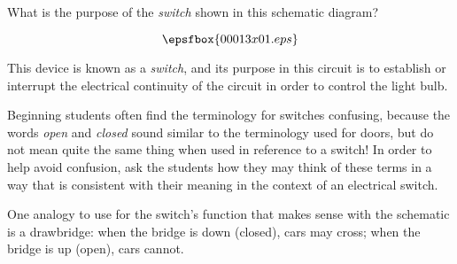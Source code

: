 

What is the purpose of the {\it switch} shown in this schematic diagram?

$$\epsfbox{00013x01.eps}$$







This device is known as a {\it switch}, and its purpose in this circuit is to establish or interrupt the electrical continuity of the circuit in order to control the light bulb.







Beginning students often find the terminology for switches confusing, because the words {\it open} and {\it closed} sound similar to the terminology used for doors, but do not mean quite the same thing when used in reference to a switch!  In order to help avoid confusion, ask the students how they may think of these terms in a way that is consistent with their meaning in the context of an electrical switch.

One analogy to use for the switch's function that makes sense with the schematic is a drawbridge: when the bridge is down (closed), cars may cross; when the bridge is up (open), cars cannot.




